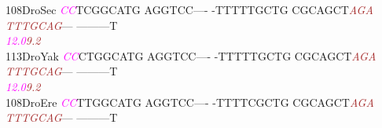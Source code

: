 \documentclass[11pt,twoside,reqno,a4paper]{article}
\begin{document}
{108\hspace*{1\charwidth}DroSec	\textit{\textcolor{magenta}{C}}\textit{\textcolor{magenta}{C}}TCGGCATG	AGGTCC----	-TTTTTGCTG	CGCAGCT\textit{\textcolor{brown}{A}}\textit{\textcolor{brown}{G}}\textit{\textcolor{brown}{A}}	\textit{\textcolor{brown}{T}}\textit{\textcolor{brown}{T}}\textit{\textcolor{brown}{T}}\textit{\textcolor{brown}{G}}\textit{\textcolor{brown}{C}}\textit{\textcolor{brown}{A}}\textit{\textcolor{brown}{G}}---	---------T	\\
\hspace*{4\charwidth}\hspace*{7\charwidth}\hspace*{0\charwidth}\textit{\textcolor{magenta}{12.0}}\hspace*{1\charwidth}\hspace*{1\charwidth}\hspace*{1\charwidth}\hspace*{33\charwidth}\textit{\textcolor{brown}{9.2}}\hspace*{1\charwidth}\hspace*{1\charwidth}\hspace*{1\charwidth}\\
113\hspace*{1\charwidth}DroYak	\textit{\textcolor{magenta}{C}}\textit{\textcolor{magenta}{C}}CTGGCATG	AGGTCC----	-TTTTTGCTG	CGCAGCT\textit{\textcolor{brown}{A}}\textit{\textcolor{brown}{G}}\textit{\textcolor{brown}{A}}	\textit{\textcolor{brown}{T}}\textit{\textcolor{brown}{T}}\textit{\textcolor{brown}{T}}\textit{\textcolor{brown}{G}}\textit{\textcolor{brown}{C}}\textit{\textcolor{brown}{A}}\textit{\textcolor{brown}{G}}---	---------T	\\
\hspace*{4\charwidth}\hspace*{7\charwidth}\hspace*{0\charwidth}\textit{\textcolor{magenta}{12.0}}\hspace*{1\charwidth}\hspace*{1\charwidth}\hspace*{1\charwidth}\hspace*{33\charwidth}\textit{\textcolor{brown}{9.2}}\hspace*{1\charwidth}\hspace*{1\charwidth}\hspace*{1\charwidth}\\
108\hspace*{1\charwidth}DroEre	\textit{\textcolor{magenta}{C}}\textit{\textcolor{magenta}{C}}TTGGCATG	AGGTCC----	-TTTTCGCTG	CGCAGCT\textit{\textcolor{brown}{A}}\textit{\textcolor{brown}{G}}\textit{\textcolor{brown}{A}}	\textit{\textcolor{brown}{T}}\textit{\textcolor{brown}{T}}\textit{\textcolor{brown}{T}}\textit{\textcolor{brown}{G}}\textit{\textcolor{brown}{C}}\textit{\textcolor{brown}{A}}\textit{\textcolor{brown}{G}}---	---------T	\\
}
\end{document}
